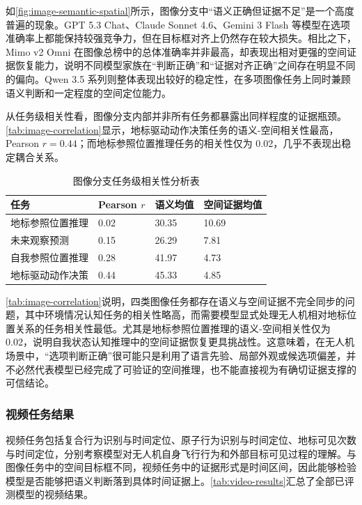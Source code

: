 如\autoref{fig:image-semantic-spatial}所示，图像分支中“语义正确但证据不足”是一个高度普遍的现象。GPT 5.3 Chat、Claude Sonnet 4.6、Gemini 3 Flash 等模型在选项准确率上都能保持较强竞争力，但在目标框对齐上仍然存在较大损失。相比之下，Mimo v2 Omni 在图像总榜中的总体准确率并非最高，却表现出相对更强的空间证据恢复能力，说明不同模型家族在“判断正确”和“证据对齐正确”之间存在明显不同的偏向。Qwen 3.5 系列则整体表现出较好的稳定性，在多项图像任务上同时兼顾语义判断和一定程度的空间定位能力。

从任务级相关性看，图像分支内部并非所有任务都暴露出同样程度的证据瓶颈。\autoref{tab:image-correlation}显示，地标驱动动作决策任务的语义-空间相关性最高，Pearson \(r=0.44\)；而地标参照位置推理任务的相关性仅为 0.02，几乎不表现出稳定耦合关系。

\begin{table}[htbp]
    \centering
    \caption{图像分支任务级相关性分析表}
    \label{tab:image-correlation}
    \begin{tabularx}{\textwidth}{V{\dimexpr\textwidth-8.1cm-8\tabcolsep\relax}*{3}{U{2.7cm}}}
        \toprule
        任务 & Pearson \(r\) & 语义均值 & 空间证据均值 \\
        \midrule
        地标参照位置推理 & 0.02 & 30.35 & 10.69 \\
        未来观察预测 & 0.15 & 26.29 & 7.81 \\
        自我参照位置推理 & 0.28 & 41.97 & 4.73 \\
        地标驱动动作决策 & 0.44 & 45.33 & 4.85 \\
        \bottomrule
    \end{tabularx}
\end{table}

\autoref{tab:image-correlation}说明，四类图像任务都存在语义与空间证据不完全同步的问题，其中环境情况认知任务的相关性略高，而需要模型显式处理无人机相对地标位置关系的任务相关性最低。尤其是地标参照位置推理的语义-空间相关性仅为 0.02，说明自我状态认知推理中的空间证据恢复更具挑战性。这意味着，在无人机场景中，“选项判断正确”很可能只是利用了语言先验、局部外观或候选项偏差，并不必然代表模型已经完成了可验证的空间推理，也不能直接视为有确切证据支撑的可信结论。

\FloatBarrier
\subsubsection{视频任务结果}

视频任务包括复合行为识别与时间定位、原子行为识别与时间定位、地标可见次数与时间定位，分别考察模型对无人机自身飞行行为和外部目标可见过程的理解。与图像任务中的空间目标框不同，视频任务中的证据形式是时间区间，因此能够检验模型是否能够把语义判断落到具体时间证据上。\autoref{tab:video-results}汇总了全部已评测模型的视频结果。

